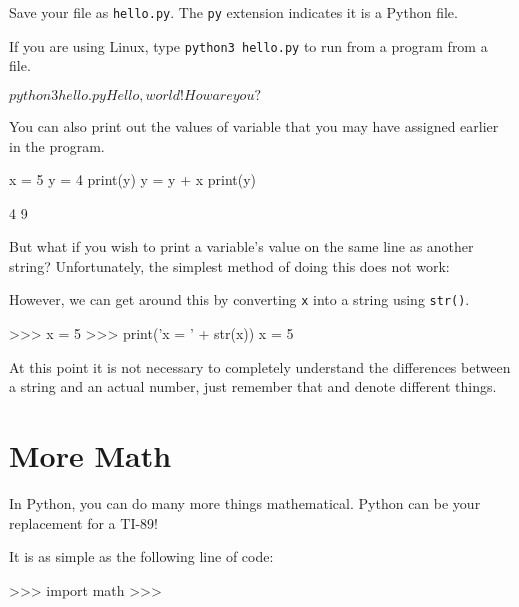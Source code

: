 \documentclass[11pt]{cselabheader}
\begin{document}
Save your file as \texttt{hello.py}. The \texttt{py} extension indicates it is a
Python file.

If you are using Linux, type \texttt{python3 hello.py} to run from a program
from a file.

\begin{bashcode}
$ python3 hello.py
Hello, world!
How are you?
$
\end{bashcode}

You can also print out the values of variable that you may have assigned earlier
in the program.

\begin{python3code}
x = 5
y = 4
print(y)
y = y + x
print(y)
\end{python3code}

\begin{bashcode}
4
9
\end{bashcode}

But what if you wish to print a variable's value on the same line as another
string? Unfortunately, the simplest method of doing this does not work:


However, we can get around this by converting \texttt{x} into a string using
\texttt{str()}.

\begin{python3code}
>>> x = 5
>>> print('x = ' + str(x))
x = 5
\end{python3code}

At this point it is not necessary to completely understand the differences
between a string and an actual number, just remember that 
and  denote different things.

\pagebreak

\section{More Math}

In Python, you can do many more things mathematical. Python can be your
replacement for a TI-89!

It is as simple as the following line of code:

\begin{python3code}
>>> import math
>>>
\end{python3code}
\end{document}
